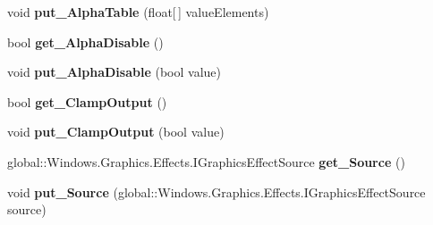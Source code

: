 \begin{DoxyCompactItemize}
\item 
\mbox{\label{class_microsoft_1_1_graphics_1_1_canvas_1_1_effects_1_1_table_transfer_effect_aac8fee86822eff6ca3b5c5275197f260}} 
void {\bfseries put\+\_\+\+Alpha\+Table} (float\mbox{[}$\,$\mbox{]} value\+Elements)
\item 
\mbox{\label{class_microsoft_1_1_graphics_1_1_canvas_1_1_effects_1_1_table_transfer_effect_a3832d4911f5abf2e68803f2cef0cb20e}} 
bool {\bfseries get\+\_\+\+Alpha\+Disable} ()
\item 
\mbox{\label{class_microsoft_1_1_graphics_1_1_canvas_1_1_effects_1_1_table_transfer_effect_ae3e9c105dcf75c2cbf1cf7090035ab32}} 
void {\bfseries put\+\_\+\+Alpha\+Disable} (bool value)
\item 
\mbox{\label{class_microsoft_1_1_graphics_1_1_canvas_1_1_effects_1_1_table_transfer_effect_a238185a45fff4ece82f505b494c90307}} 
bool {\bfseries get\+\_\+\+Clamp\+Output} ()
\item 
\mbox{\label{class_microsoft_1_1_graphics_1_1_canvas_1_1_effects_1_1_table_transfer_effect_a7f810c0d46c569cf3f366d0d456c3996}} 
void {\bfseries put\+\_\+\+Clamp\+Output} (bool value)
\item 
\mbox{\label{class_microsoft_1_1_graphics_1_1_canvas_1_1_effects_1_1_table_transfer_effect_a237dc343b1165d3bc00b542c9174fcf0}} 
global\+::\+Windows.\+Graphics.\+Effects.\+I\+Graphics\+Effect\+Source {\bfseries get\+\_\+\+Source} ()
\item 
\mbox{\label{class_microsoft_1_1_graphics_1_1_canvas_1_1_effects_1_1_table_transfer_effect_acf80abbd4552400f00b0f225696e9c66}} 
void {\bfseries put\+\_\+\+Source} (global\+::\+Windows.\+Graphics.\+Effects.\+I\+Graphics\+Effect\+Source source)

\end{DoxyCompactItemize}
